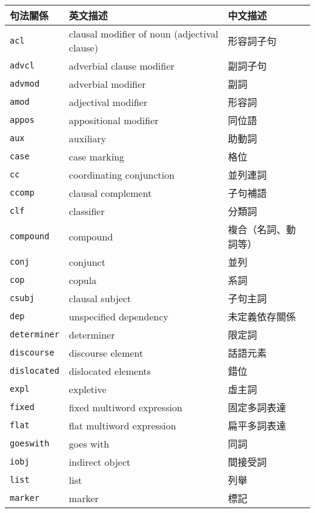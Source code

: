\begin{table}[h!]
    \centering
    \begin{tabular}[t]{|l | l l|}
        \hline
        \textbf{句法關係} & \textbf{英文描述} & \textbf{中文描述} \\
        \hline
        \texttt{acl} & clausal modifier of noun (adjectival clause) & 形容詞子句 \\
        \texttt{advcl} & adverbial clause modifier & 副詞子句 \\
        \texttt{advmod} & adverbial modifier & 副詞 \\
        \texttt{amod} & adjectival modifier & 形容詞 \\
        \texttt{appos} &  appositional modifier & 同位語 \\
        \texttt{aux} & auxiliary & 助動詞 \\
        \texttt{case} & case marking & 格位 \\
        \texttt{cc} &  coordinating conjunction & 並列連詞 \\
        \texttt{ccomp} & clausal complement & 子句補語 \\
        \texttt{clf} & classifier & 分類詞 \\
        \texttt{compound} & compound & 複合（名詞、動詞等）\\
        \texttt{conj} & conjunct & 並列 \\
        \texttt{cop} & copula & 系詞 \\
        \texttt{csubj} & clausal subject & 子句主詞 \\
        \texttt{dep} & unspecified dependency & 未定義依存關係 \\
        \texttt{determiner} & determiner& 限定詞 \\
        \texttt{discourse} & discourse element & 話語元素 \\
        \texttt{dislocated} & dislocated elements & 錯位 \\
        \texttt{expl} & expletive & 虛主詞 \\
        \texttt{fixed} & fixed multiword expression & 固定多詞表達 \\
        \texttt{flat} & flat multiword expression & 扁平多詞表達 \\
        \texttt{goeswith} & goes with & 同詞 \\
        \texttt{iobj} & indirect object & 間接受詞 \\
        \texttt{list} & list & 列舉 \\
        \texttt{marker} & marker & 標記 \\

\end{tabular}
\end{table}
